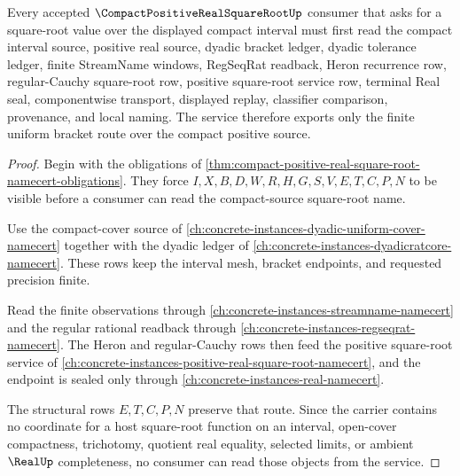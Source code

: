 \begin{theorem}
\label{thm:compact-positive-real-square-root-uniform-bracket-service}
Every accepted $\CompactPositiveRealSquareRootUp$ consumer that asks for a square-root value over the displayed compact interval must first read the compact interval source, positive real source, dyadic bracket ledger, dyadic tolerance ledger, finite StreamName windows, RegSeqRat readback, Heron recurrence row, regular-Cauchy square-root row, positive square-root service row, terminal Real seal, componentwise transport, displayed replay, classifier comparison, provenance, and local naming. The service therefore exports only the finite uniform bracket route over the compact positive source.
\end{theorem}
\begin{proof}
Begin with the obligations of \autoref{thm:compact-positive-real-square-root-namecert-obligations}. They force $I,X,B,D,W,R,H,G,S,V,E,T,C,P,N$ to be visible before a consumer can read the compact-source square-root name.

Use the compact-cover source of \autoref{ch:concrete-instances-dyadic-uniform-cover-namecert} together with the dyadic ledger of \autoref{ch:concrete-instances-dyadicratcore-namecert}. These rows keep the interval mesh, bracket endpoints, and requested precision finite.

Read the finite observations through \autoref{ch:concrete-instances-streamname-namecert} and the regular rational readback through \autoref{ch:concrete-instances-regseqrat-namecert}. The Heron and regular-Cauchy rows then feed the positive square-root service of \autoref{ch:concrete-instances-positive-real-square-root-namecert}, and the endpoint is sealed only through \autoref{ch:concrete-instances-real-namecert}.

The structural rows $E,T,C,P,N$ preserve that route. Since the carrier contains no coordinate for a host square-root function on an interval, open-cover compactness, trichotomy, quotient real equality, selected limits, or ambient $\RealUp$ completeness, no consumer can read those objects from the service.
\end{proof}



